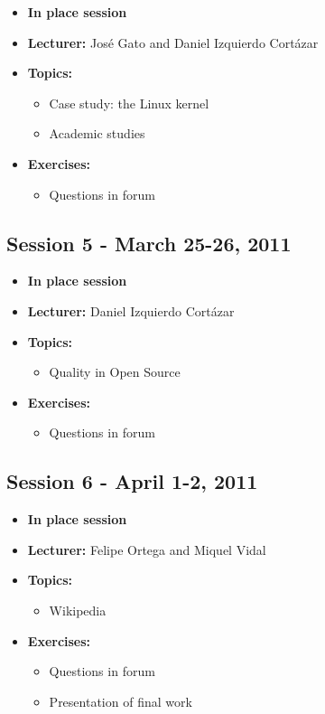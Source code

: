 \documentclass[a4paper]{article}
\begin{document}
\begin{itemize}
\item \textbf{In place session}
\item \textbf{Lecturer:} José Gato and Daniel Izquierdo Cortázar
\item \textbf{Topics:}
  \begin{itemize}
    \item Case study: the Linux kernel
    \item Academic studies
  \end{itemize}
\item \textbf{Exercises:}
  \begin{itemize}
    \item Questions in forum 
  \end{itemize}

\end{itemize}


\subsection{Session 5 - March 25-26, 2011}

\begin{itemize}
\item \textbf{In place session}
\item \textbf{Lecturer:} Daniel Izquierdo Cortázar
\item \textbf{Topics:}
  \begin{itemize}
    \item Quality in Open Source
  \end{itemize}
\item \textbf{Exercises:}
  \begin{itemize}
    \item Questions in forum 
  \end{itemize}

\end{itemize}


\subsection{Session 6 - April 1-2, 2011}

\begin{itemize}
\item \textbf{In place session}
\item \textbf{Lecturer:} Felipe Ortega and Miquel Vidal
\item \textbf{Topics:}
  \begin{itemize}
    \item Wikipedia
  \end{itemize}
\item \textbf{Exercises:}
  \begin{itemize}
    \item Questions in forum 
    \item Presentation of final work
  \end{itemize}

\end{itemize}
\end{document}
